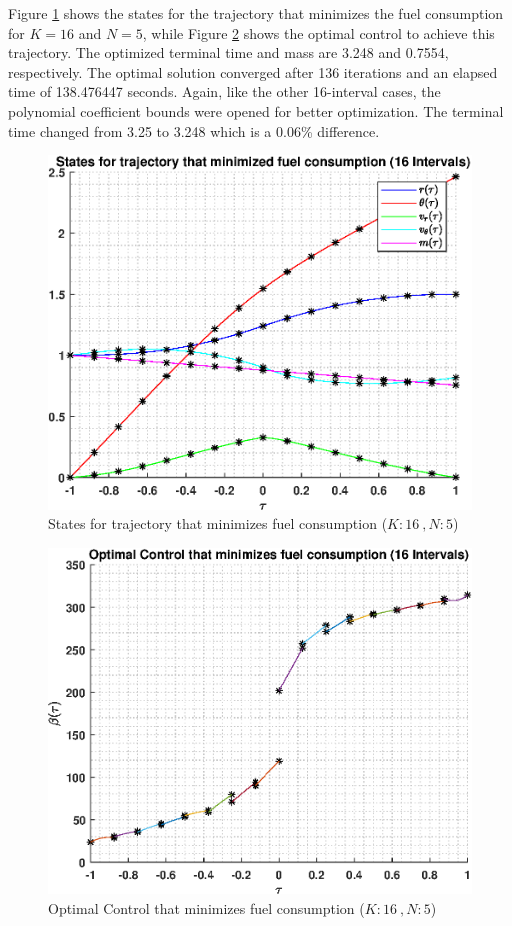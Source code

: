 \documentclass[]{article}
\begin{document}
Figure \ref{fig:directStatesK16Poly5} shows the states for the trajectory that minimizes the fuel consumption for \(K = 16\) and  \(N = 5\), while Figure \ref{fig:directControlK16Poly5} shows the optimal control to achieve this trajectory. The optimized terminal time and mass are 3.248 and 0.7554, respectively. The optimal solution converged after 136 iterations and an elapsed time of 138.476447 seconds. Again, like the other 16-interval cases, the polynomial coefficient bounds were opened for better optimization. The terminal time changed from 3.25 to 3.248 which is a 0.06\% difference. 
\begin{figure}
	\centering
	\includegraphics[scale=0.75]{directStatesK16Poly5.eps}
	\caption{States for trajectory that minimizes fuel consumption (\(K:16\ , N:5\))}
	\label{fig:directStatesK16Poly5}
\end{figure}
\begin{figure}
	\centering
	\includegraphics[scale=0.75]{directControlK16Poly5.eps}
	\caption{Optimal Control that minimizes fuel consumption (\(K:16\ , N:5\))}
	\label{fig:directControlK16Poly5}
\end{figure}
\FloatBarrier
\end{document}
